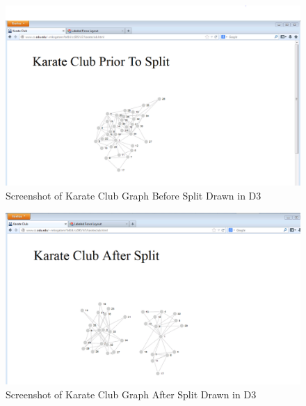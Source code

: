 
\newpage


\begin{figure}[ht]    
    \begin{center}
        \includegraphics[scale=0.45]{q1/karateclub-beforesplit.PNG}
        \caption{Screenshot of Karate Club Graph Before Split Drawn in D3}
        \label{fig:kclub-beforesplit}
    \end{center}
\end{figure}

\begin{figure}[ht]    
    \begin{center}
        \includegraphics[scale=0.45]{q1/karateclub-aftersplit.PNG}
        \caption{Screenshot of Karate Club Graph After Split Drawn in D3}
        \label{fig:kclub-aftersplit}
    \end{center}
\end{figure}
